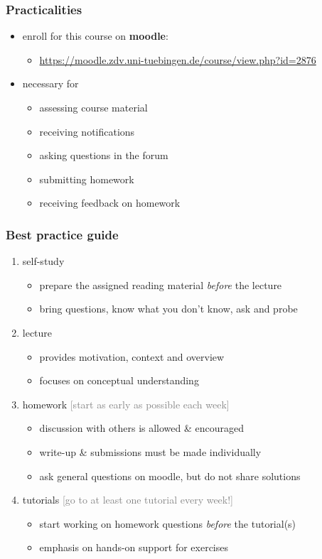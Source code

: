\documentclass[fleqn,10pt,serif,xcolor=svgnames,xcolor=table,aspectratio=169,handout]{beamer}
\newcommand{\mycom}[1]{\hfill {\mygray{[#1]}}}
\newcommand{\mygray}[1]{\textcolor{gray}{#1}}
\begin{document}
\begin{frame}
  \frametitle{Practicalities}
  \begin{itemize}
    \item enroll for this course on \textbf{moodle}:
    \begin{itemize}
      \item \url{https://moodle.zdv.uni-tuebingen.de/course/view.php?id=2876}
    \end{itemize}
    \item necessary for
    \begin{itemize}
      \item assessing course material
      \item receiving notifications
      \item asking questions in the forum
      \item submitting homework
      \item receiving feedback on homework
    \end{itemize}
  \end{itemize}
\end{frame}

\begin{frame}
  \frametitle{Best practice guide}
  \begin{enumerate}
    \item self-study
    \begin{itemize}
      \item prepare the assigned reading material \emph{before} the lecture
      \item bring questions, know what you don't know, ask and probe
    \end{itemize}
    \item lecture
    \begin{itemize}
      \item provides motivation, context and overview
      \item focuses on conceptual understanding
    \end{itemize}
    \item homework \hfill \mycom{start as early as possible each week}
    \begin{itemize}
      \item discussion with others is allowed \& encouraged
      \item write-up \& submissions must be made individually
      \item ask general questions on moodle, but do not share solutions
    \end{itemize}
    \item tutorials \hfill \mycom{go to at least one tutorial every week!}
    \begin{itemize}
      \item start working on homework questions \emph{before} the tutorial(s)
      \item emphasis on hands-on support for exercises
    \end{itemize}
  \end{enumerate}
\end{frame}
\end{document}
